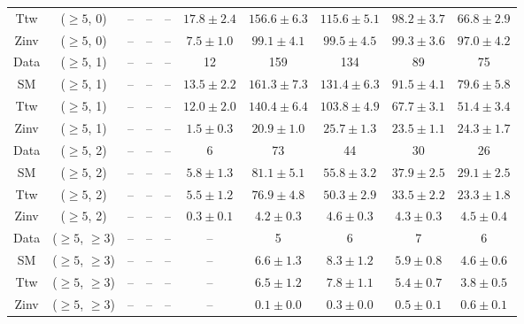 \begin{table}[h!]
{\begin{tabular}{cccccccccc}
	Ttw & ($\ge5$, 0) & -- & -- & -- & $17.8\pm 2.4$ & $156.6\pm 6.3$ & $115.6\pm 5.1$ & $98.2\pm 3.7$ & $66.8\pm 2.9$ \\[0.5ex] 
	Zinv & ($\ge5$, 0) & -- & -- & -- & $7.5\pm 1.0$ & $99.1\pm 4.1$ & $99.5\pm 4.5$ & $99.3\pm 3.6$ & $97.0\pm 4.2$ \\[0.5ex] 
	Data & ($\ge5$, 1) & -- & -- & -- & 12 & 159 & 134 & 89 & 75 \\[0.5ex] 
	SM & ($\ge5$, 1) & -- & -- & -- & $13.5\pm 2.2$ & $161.3\pm 7.3$ & $131.4\pm 6.3$ & $91.5\pm 4.1$ & $79.6\pm 5.8$ \\[0.5ex] 
	Ttw & ($\ge5$, 1) & -- & -- & -- & $12.0\pm 2.0$ & $140.4\pm 6.4$ & $103.8\pm 4.9$ & $67.7\pm 3.1$ & $51.4\pm 3.4$ \\[0.5ex] 
	Zinv & ($\ge5$, 1) & -- & -- & -- & $1.5\pm 0.3$ & $20.9\pm 1.0$ & $25.7\pm 1.3$ & $23.5\pm 1.1$ & $24.3\pm 1.7$ \\[0.5ex] 
	Data & ($\ge5$, 2) & -- & -- & -- & 6 & 73 & 44 & 30 & 26 \\[0.5ex] 
	SM & ($\ge5$, 2) & -- & -- & -- & $5.8\pm 1.3$ & $81.1\pm 5.1$ & $55.8\pm 3.2$ & $37.9\pm 2.5$ & $29.1\pm 2.5$ \\[0.5ex] 
	Ttw & ($\ge5$, 2) & -- & -- & -- & $5.5\pm 1.2$ & $76.9\pm 4.8$ & $50.3\pm 2.9$ & $33.5\pm 2.2$ & $23.3\pm 1.8$ \\[0.5ex] 
	Zinv & ($\ge5$, 2) & -- & -- & -- & $0.3\pm 0.1$ & $4.2\pm 0.3$ & $4.6\pm 0.3$ & $4.3\pm 0.3$ & $4.5\pm 0.4$ \\[0.5ex] 
	Data & ($\ge5$, $\ge3$) & -- & -- & -- & -- & 5 & 6 & 7 & 6 \\[0.5ex] 
	SM & ($\ge5$, $\ge3$) & -- & -- & -- & -- & $6.6\pm 1.3$ & $8.3\pm 1.2$ & $5.9\pm 0.8$ & $4.6\pm 0.6$ \\[0.5ex] 
	Ttw & ($\ge5$, $\ge3$) & -- & -- & -- & -- & $6.5\pm 1.2$ & $7.8\pm 1.1$ & $5.4\pm 0.7$ & $3.8\pm 0.5$ \\[0.5ex] 
	Zinv & ($\ge5$, $\ge3$) & -- & -- & -- & -- & $0.1\pm 0.0$ & $0.3\pm 0.0$ & $0.5\pm 0.1$ & $0.6\pm 0.1$ \\[0.5ex] 
	\hline
	\hline
\end{tabular}}
\end{table}

